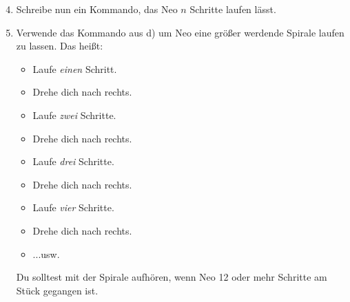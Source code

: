\begin{enumerate}\setcounter{enumi}{3}
	\item
		Schreibe nun ein Kommando, das Neo $n$ Schritte laufen lässt.

	\item
		Verwende das Kommando aus d) um Neo eine größer werdende Spirale laufen zu lassen.
		Das heißt:

		\begin{itemize}
			\item[] Laufe \emph{einen} Schritt.
			\item[] Drehe dich nach rechts.
			\item[] Laufe \emph{zwei} Schritte.
			\item[] Drehe dich nach rechts.
			\item[] Laufe \emph{drei} Schritte.
			\item[] Drehe dich nach rechts.
			\item[] Laufe \emph{vier} Schritte.
			\item[] Drehe dich nach rechts.
			\item[] ...usw.
		\end{itemize}

		Du solltest mit der Spirale aufhören, wenn Neo 12 oder mehr Schritte am Stück gegangen ist.
\end{enumerate}

\newpage
